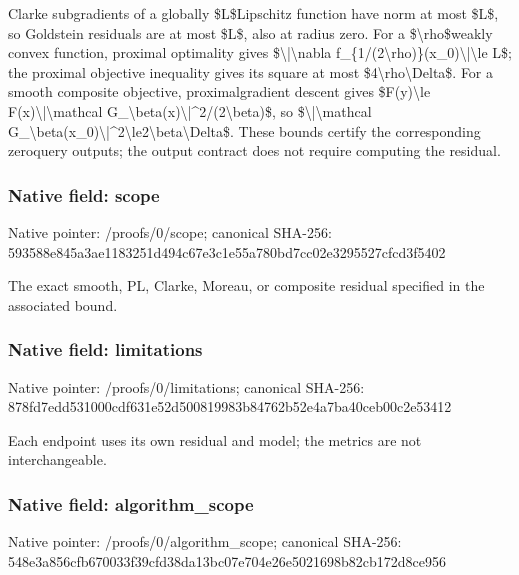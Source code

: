 \documentclass[10pt,a4paper]{article}
\begin{document}
Clarke subgradients of a globally \$L\$Lipschitz function have norm at most \$L\$, so Goldstein residuals are at most \$L\$, also at radius zero. For a \$\textbackslash{}rho\$weakly convex function, proximal optimality gives
\$\textbackslash{}|\textbackslash{}nabla f\_\{1/(2\textbackslash{}rho)\}(x\_0)\textbackslash{}|\textbackslash{}le L\$; the proximal objective inequality gives its square at most \$4\textbackslash{}rho\textbackslash{}Delta\$.
For a smooth composite objective, proximalgradient descent gives
\$F(y)\textbackslash{}le F(x)\textbackslash{}|\textbackslash{}mathcal G\_\textbackslash{}beta(x)\textbackslash{}|\textasciicircum{}2/(2\textbackslash{}beta)\$,
so \$\textbackslash{}|\textbackslash{}mathcal G\_\textbackslash{}beta(x\_0)\textbackslash{}|\textasciicircum{}2\textbackslash{}le2\textbackslash{}beta\textbackslash{}Delta\$.
These bounds certify the corresponding zeroquery outputs; the output contract does not require computing the residual.


\subsubsection{Native field: scope}


Native pointer: /proofs/0/scope; canonical SHA-256: 593588e845a3ae1183251d49\allowbreak{}4c67e3c1e55a780bd7cc02e3\allowbreak{}295527cfcd3f5402


The exact smooth, PL, Clarke, Moreau, or composite residual specified in the associated bound.


\subsubsection{Native field: limitations}


Native pointer: /proofs/0/limitations; canonical SHA-256: 878fd7edd531000cdf631e52\allowbreak{}d500819983b84762b52e4a7b\allowbreak{}a40ceb00c2e53412


Each endpoint uses its own residual and model; the metrics are not interchangeable.


\subsubsection{Native field: algorithm\_scope}


Native pointer: /proofs/0/algorithm\_scope; canonical SHA-256: 548e3a856cfb670033f39cfd\allowbreak{}38da13bc07e704e26e502169\allowbreak{}8b82cb172d8ce956
\end{document}
